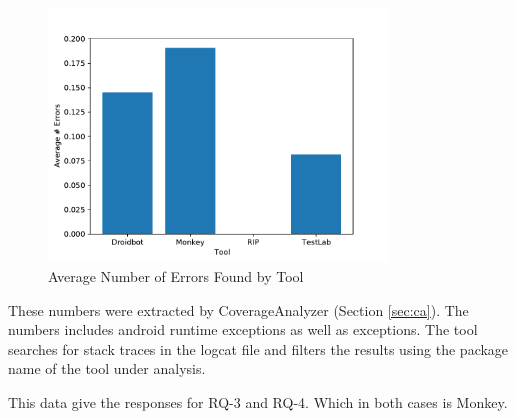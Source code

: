 \begin{figure}[h]
\centering
\includegraphics[width=0.8\textwidth]{../Figures/averageErrors.pdf}
\caption{Average Number of Errors Found by Tool}\label{fig:averagaerrors}
\end{figure}

These numbers were extracted by CoverageAnalyzer (Section \ref{sec:ca}). The numbers includes android runtime exceptions as well as exceptions. The tool searches for stack traces in the logcat file and filters the results using the package name of the tool under analysis. 

This data give the responses for RQ-3 and RQ-4. Which in both cases is Monkey.

